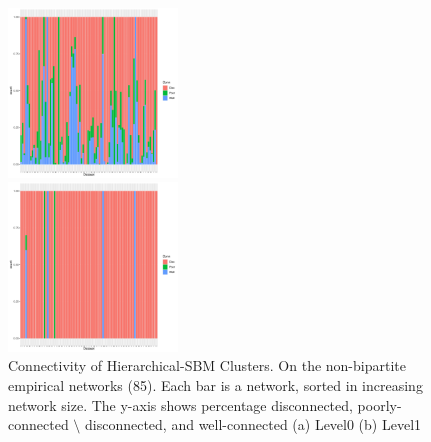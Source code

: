 \documentclass[aps,pre,superscriptaddress]{revtex4}
\begin{document}
\begin{figure}[ht]
	\centering
	\begin{subfloat}
		\centering
		\includegraphics[width=0.4\textwidth]{fig3a.pdf}
	\end{subfloat}
	\begin{subfloat}
		\centering
		\includegraphics[width=0.4\textwidth]{fig3b.pdf}
	\end{subfloat}
	\caption{Connectivity of Hierarchical-SBM Clusters.
		On the non-bipartite empirical networks (85).
		Each bar is a network, sorted in increasing network size.
		The y-axis shows percentage disconnected, poorly-connected $\setminus$ disconnected, and well-connected
		(a) Level0 (b) Level1}
	\label{figs:fig2}
\end{figure}
\end{document}
